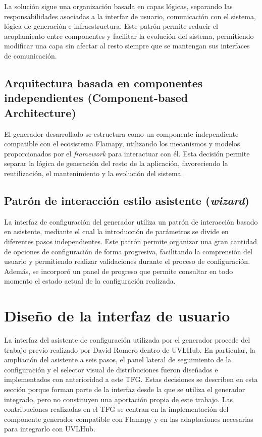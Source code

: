 La solución sigue una organización basada en capas lógicas, separando las
responsabilidades asociadas a la interfaz de usuario, comunicación con el
sistema, lógica de generación e infraestructura. Este patrón permite reducir
el acoplamiento entre componentes y facilitar la evolución del sistema,
permitiendo modificar una capa sin afectar al resto siempre que se mantengan
sus interfaces de comunicación.

\subsection*{Arquitectura basada en componentes independientes (Component-based Architecture)}

El generador desarrollado se estructura como un componente independiente compatible con el ecosistema Flamapy, utilizando los mecanismos y modelos proporcionados por el \textit{framework} para interactuar con él. Esta decisión permite separar la lógica de generación del resto de la aplicación, favoreciendo la reutilización, el mantenimiento y la evolución del sistema.

\subsection{Patrón de interacción estilo asistente (\textit{wizard})}
La interfaz de configuración del generador utiliza un patrón de interacción
basado en asistente, mediante el cual la introducción de parámetros se
divide en diferentes pasos independientes. Este patrón permite organizar una
gran cantidad de opciones de configuración de forma progresiva, facilitando
la comprensión del usuario y permitiendo realizar validaciones durante el
proceso de configuración. Además, se incorporó un panel de progreso que
permite consultar en todo momento el estado actual de la configuración
realizada.


\section{Diseño de la interfaz de usuario}
\label{sec:ui_ux}


La interfaz del asistente de configuración utilizada por el generador procede
del trabajo previo realizado por David Romero dentro de UVLHub. En particular,
la ampliación del asistente a seis pasos, el panel lateral de seguimiento de la
configuración y el selector visual de distribuciones fueron diseñados e
implementados con anterioridad a este TFG. Estas decisiones se describen en
esta sección porque forman parte de la interfaz desde la que se utiliza el
generador integrado, pero no constituyen una aportación propia de este trabajo.
Las contribuciones realizadas en el TFG se centran en la implementación del
componente generador compatible con Flamapy y en las adaptaciones necesarias
para integrarlo con UVLHub.


